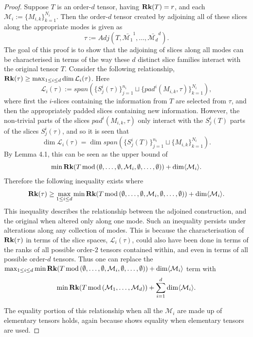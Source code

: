 \documentclass[../Lael_John_MasterThesis_Draft.tex]{subfiles}
\begin{document}
\begin{proof}
    Suppose $T$ is an order-$d$ tensor, having $\textbf{Rk}(T) = r$, and each $\mathcal{M}_i := \{M_{i, k}\}_{k=1}^{N_i}$. Then the order-$d$ tensor created by adjoining all of these slices along the appropriate modes is given as $$\tau := Adj(T, \bar{\mathcal{M}_1}^1, \ldots, \bar{\mathcal{M}_d}^d).$$ The goal of this proof is to show that the adjoining of slices along all modes can be characterised in terms of the way these $d$ distinct slice families interact with the original tensor $T$.
    Consider the following relationship, $\textbf{Rk}(\tau) \geq \max_{1 \leq i \leq d} \dim \mathcal{L}_i(\tau)$. Here $$\mathcal{L}_i(\tau):= span \left(\{ S^i_j(\tau)\}_{j=1}^{n_i} \sqcup \{ pad^i(M_{i,k}, \tau) \}_{k=1}^{N_i}\right),$$ where first the $i$-slices containing the information from $T$ are selected from $\tau$, and then the appropriately padded slices containing new information. However, the non-trivial parts of the slices $pad^i(M_{i,k}, \tau)$ only interact with the $S^i_j(T)$ parts of the slices $S^i_j(\tau)$, and so it is seen that $$\dim \mathcal{L}_i(\tau) = \dim span(\{S^i_j(T)\}_{j=1}^{n_i} \sqcup \{M_{i,k}\}_{k=1}^{N_i}).$$ By Lemma 4.1, this can be seen as the upper bound of $$\min \textbf{Rk}(T\text{\,mod\,}(\emptyset, \ldots, \emptyset,\mathcal{M}_i,\emptyset, \ldots, \emptyset)) + \dim \langle \mathcal{M}_i \rangle.$$ Therefore the following inequality exists where $$\textbf{Rk}(\tau) \geq \max_{1 \leq i \leq d} \min \textbf{Rk}(T\text{\,mod\,}(\emptyset, \ldots, \emptyset,\mathcal{M}_i,\emptyset, \ldots, \emptyset)) + \dim \langle \mathcal{M}_i \rangle.$$ This inequality describes the relationship between the adjoined construction, and the original when altered only along one mode. Such an inequality persists under alterations along any collection of modes. This is because the characterisation of $\textbf{Rk}(\tau)$ in terms of the slice spaces, $\mathcal{L}_i(\tau)$, could also have been done in terms of the ranks of all possible order-$2$ tensors contained within, and even in terms of all possible order-$d$ tensors. Thus one can replace the $\max_{1 \leq i \leq d} \min \textbf{Rk}(T\text{\,mod\,}(\emptyset, \ldots, \emptyset,\mathcal{M}_i,\emptyset, \ldots, \emptyset)) + \dim \langle \mathcal{M}_i \rangle$ term with $$\min \textbf{Rk}(T\text{\,mod\,}(\mathcal{M}_1, \ldots, \mathcal{M}_d)) + \sum_{i=1}^{d}\dim \langle \mathcal{M}_i \rangle.$$

    The equality portion of this relationship when all the $\mathcal{M}_i$ are made up of elementary tensors holds, again because  shows equality when elementary tensors are used. 
\end{proof}
\end{document}

